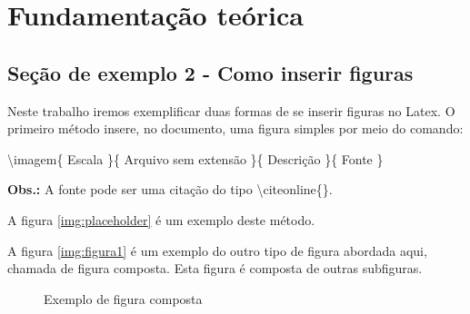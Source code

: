 \chapter{Fundamentação teórica} \label{ch:FundamentaçãoTeórica}




\section{Seção de exemplo 2 - Como inserir figuras}

Neste trabalho iremos exemplificar duas formas de se inserir figuras no Latex. O primeiro método insere, no documento, uma figura simples por meio do comando:

\textbackslash imagem\{ Escala \}\{ Arquivo sem extensão \}\{ Descrição \}\{ Fonte \}

\textbf{Obs.:} A fonte pode ser uma citação do tipo  \textbackslash citeonline\{\}.

A figura \ref{img:placeholder} é um exemplo deste método.


A figura \ref{img:figura1} é um exemplo do outro tipo de figura abordada aqui, chamada de figura composta. Esta figura é composta de outras subfiguras.
\begin{figure}[!htb]
\centering
    \caption{\label{img:figura1} Exemplo de figura composta}
    \qquad
    \vspace{1.5em}
\label{fig:dag}
\end{figure}

